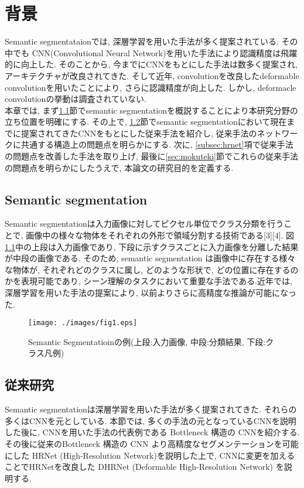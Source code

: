 \chapter{背景}\label{chap:haikei}
Semantic segmentataionでは, 深層学習を用いた手法が多く提案されている. その中でも CNN(Convolutional Neural Network)\cite{cnn}を用いた手法により認識精度は飛躍的に向上した. そのことから, 今までにCNNをもとにした手法は数多く提案され, アーキテクチャが改良されてきた. そして近年, convolutionを改良したdeformable convolution\cite{defconv}を用いたことにより, さらに認識精度が向上した. しかし, deformacle convolutionの挙動は調査されていない. \\
本章では, まず\ref{chap:semantic}節でsemantic segmentationを概説することにより本研究分野の立ち位置を明確にする. その上で, \ref{sec:zyuurai}節でsemantic segmentationにおいて現在までに提案されてきたCNNをもとにした従来手法を紹介し, 従来手法のネットワークに共通する構造上の問題点を明らかにする. 次に, \ref{subsec:hrnet}項で従来手法の問題点を改善した手法を取り上げ, 最後に\ref{sec:mokuteki}節でこれらの従来手法の問題点を明らかにしたうえで, 本論文の研究目的を定義する.


\section{Semantic segmentation}\label{chap:semantic}
Semantic segmentationは入力画像に対してピクセル単位でクラス分類を行うことで, 画像中の様々な物体をそれぞれの外形で領域分割する技術である[3][4]. 図\ref{fig:seg_rei}中の上段は入力画像であり, 下段に示すクラスごとに入力画像を分離した結果が中段の画像である. そのため, semantic segmentation は画像中に存在する様々な物体が, それぞれどのクラスに属し, どのような形状で, どの位置に存在するのかを表現可能であり, シーン理解のタスクにおいて重要な手法である.近年では, 深層学習を用いた手法の提案により, 以前よりさらに高精度な推論が可能になった\cite{long2015fully}. 



\begin{figure}[H]
    \centering
    \texttt{[image: ./images/fig1.eps]}
    \caption{Semantic Segmentatioinの例(上段:入力画像, 中段:分類結果, 下段:クラス凡例)\cite{semaseg2}}
    \label{fig:seg_rei}
\end{figure}

\section{従来研究}\label{sec:zyuurai}
Semantic segmentationは深層学習を用いた手法が多く提案されてきた. それらの多くはCNNを元としている. 本節では, 多くの手法の元となっているCNNを説明した後に, CNNを用いた手法の代表例である Bottleneck 構造の CNNを紹介する.  その後に従来のBottleneck 構造の CNN より高精度なセグメンテーションを可能にした HRNet (High-Resolution Network)\cite{hrnet}を説明した上で,  CNNに変更を加えることでHRNetを改良した DHRNet (Deformable High-Resolution Network)\cite{dhrnet} を説明する.


